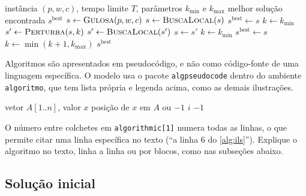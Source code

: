 \begin{algoritmo}[htbp]
  \caption{Heurística de \acs{ils} proposta para o \acs{mkp}}
  \label{alg:ils}
  \begin{algorithmic}[1]
    \Require instância $(p, w, c)$, tempo limite $T$, parâmetros $k_{\min}$ e $k_{\max}$
    \Ensure melhor solução encontrada $s^{\mathrm{best}}$
    \State $s \gets \Call{Gulosa}{p, w, c}$
    \State $s \gets \Call{BuscaLocal}{s}$
    \State $s^{\mathrm{best}} \gets s$
    \State $k \gets k_{\min}$
      \State $s' \gets \Call{Perturba}{s, k}$ 
      \State $s' \gets \Call{BuscaLocal}{s'}$
        \State $s \gets s'$
        \State $k \gets k_{\min}$
          \State $s^{\mathrm{best}} \gets s$
        \EndIf
      \Else
        \State $k \gets \min(k + 1, k_{\max})$ 
      \EndIf
    \EndWhile
    \State \Return $s^{\mathrm{best}}$
  \end{algorithmic}
  \fonteautor
\end{algoritmo}

\begin{instrucao}
Algoritmos são apresentados em pseudocódigo, e não como código-fonte de uma
linguagem específica. O modelo usa o pacote \verb|algpseudocode| dentro do
ambiente \verb|algoritmo|, que tem lista própria e legenda acima, como as
demais ilustrações.
\begin{exemplocodigo}
\begin{algoritmo}[htbp]
  \caption{Busca linear}
  \label{alg:busca}
  \begin{algorithmic}[1]
    \Require vetor $A[1..n]$, valor $x$
    \Ensure posição de $x$ em $A$ ou $-1$
        \State \Return $i$
      \EndIf
    \EndFor
    \State \Return $-1$
  \end{algorithmic}
  \fonteautor
\end{algoritmo}
\end{exemplocodigo}
O número entre colchetes em \verb|algorithmic[1]| numera todas as linhas, o
que permite citar uma linha específica no texto (``a linha 6 do
\cref{alg:ils}''). Explique o algoritmo no texto, linha a linha ou por blocos,
como nas subseções abaixo.
\end{instrucao}

\subsection{Solução inicial}
\label{sec:metodologia:inicial}

